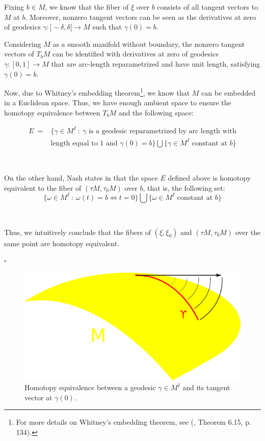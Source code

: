 \documentclass[12pt,oneside]{book}
\begin{document}
    Fixing \( b \in M \), we know that the fiber of \( \xi \) over \( b \) consists of all tangent vectors to \( M \) at \( b \). Moreover, 
    nonzero tangent vectors can be seen as the derivatives at zero of geodesics \( \gamma: ]-\delta, \delta[ \to M \) 
    such that \( \gamma(0) = b \).
    
    Considering  \( M \) as a smooth manifold without boundary, the nonzero tangent vectors of \( T_{b}M \) 
    can be identified with derivatives at zero of geodesics \( \gamma: [0,1] \to M \) that are arc-length 
    reparametrized and have unit length, satisfying  \( \gamma(0) = b \).
    
    Now, due to Whitney’s embedding theorem\footnote{For more details on Whitney’s embedding 
    theorem, see (\cite{lee_s}, Theorem 6.15, p. 134).}, we know that \( M \) can be embedded in a Euclidean space. Thus, we have enough 
    ambient space to ensure the homotopy equivalence between \( T_{b}M \) and the following space:

    $$\begin{array}{rl}
    E \ = & \{ \gamma\in M^{I} \ : \ \gamma \text{ is a geodesic reparametrized by arc length with} \\
    & \text{length equal to 1 and } \gamma(0)=b \} \bigcup \{ \gamma\in M^{I} \text{ constant at } b \}
    \end{array}$$

    \

    On the other hand, Nash states in \cite{nash} that the space $E$ defined above is homotopy equivalent to the fiber of 
    $(\tau M,\tau_{0}M)$ over $b$, that is, the following set:
    $$\{ \omega\in M^{I} \ : \ \omega(t)=b \Leftrightarrow t=0 \} \bigcup \{ \omega\in M^{I} \text{ constant at } b \}$$
    
    \

    Thus, we intuitively conclude that the fibers of $(\xi,\xi_{0})$ and $(\tau M,\tau_{0}M)$ over the same point are homotopy equivalent.

    \begin{flushright}
    $\square$
    \end{flushright}

    \begin{figure}[h]
    \centering
    \includegraphics[scale=0.3]{fibrado_tang.pdf}
    \caption{Homotopy equivalence between a geodesic $\gamma\in M^{I}$ and its tangent vector at $\gamma(0)$.}
    \end{figure}
\end{document}
